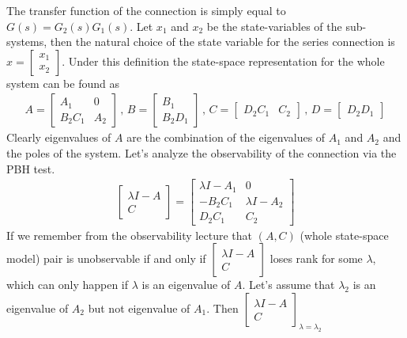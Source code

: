 \documentclass[twoside]{article}
\begin{document}
The transfer function of the connection is simply equal to $G(s) = G_2(s) G_1(s)$. Let $x_1$ and $x_2$
be the state-variables of the sub-systems, then the natural choice of the state variable for the series connection is 
$x = \begin{bmatrix} x_1 \\ x_2 \end{bmatrix}$. Under this definition the state-space representation for the whole system 
can be found as
%
\begin{align*}
A = \left[ \begin{array}{c|c} A_1 & 0 \\ \hline B_2 C_1  & A_2 \end{array} \right]
\, , \, B = \left[ \begin{array}{c} B_1 \\ \hline B_2 D_1  \end{array} \right]
\, , \, C = \left[ \begin{array}{c|c} D_2 C_1 & C_2  \end{array} \right]
\, , \, D = \left[ \begin{array}{c} D_2  D_1  \end{array} \right]
\end{align*}
%
Clearly eigenvalues of $A$ are the combination of the eigenvalues of $A_1$ and $A_2$ and the poles of the system.
Let's analyze the observability of the connection via the PBH test. 
%
\begin{align*}
	\left[ \begin{array}{c} \lambda I - A \\ \hline C \end{array} \right]
	= 
	\left[ \begin{array}{c|c} \lambda I - A_1 & 0 \\ \hline -B_2 C_1 &  \lambda I - A_2 \\ \hline 
	D_2 C_1 & C_2
	\end{array} \right]
\end{align*}
%
If we remember from the observability lecture that $(A,C)$ (whole state-space model) pair 
is unobservable if and only if $\left[ \begin{array}{c} \lambda I - A \\ \hline C \end{array} \right]$
loses rank for some $\lambda$, which can only happen if $\lambda$ is an eigenvalue of $A$.
Let's assume that $\lambda_2$ is an eigenvalue of $A_2$ but not eigenvalue of $A_1$. 
Then $\left[ \begin{array}{c} \lambda I - A \\ \hline C \end{array} \right]_{\lambda = \lambda_2}$ 
\end{document}
